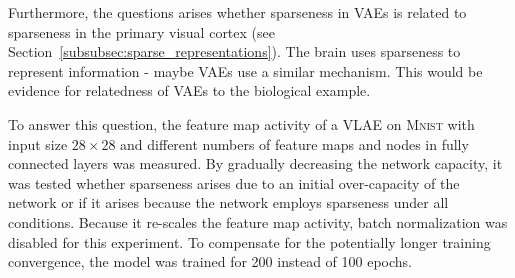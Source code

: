 Furthermore, the questions arises whether sparseness in \acp{VAE} is related to sparseness in the primary visual cortex (see Section~\ref{subsubsec:sparse_representations}).
The brain uses sparseness to represent information - maybe \acp{VAE} use a similar mechanism.
This would be evidence for relatedness of \acp{VAE} to the biological example.

To answer this question, the feature map activity of a \ac{VLAE} on \textsc{Mnist} with input size $28\times 28$ and different numbers of feature maps and nodes in fully connected layers was measured.
By gradually decreasing the network capacity, it was tested whether sparseness arises due to an initial over-capacity of the network or if it arises because the network employs sparseness under all conditions.
Because it re-scales the feature map activity, batch normalization was disabled for this experiment.
To compensate for the potentially longer training convergence, the model was trained for 200 instead of 100 epochs.

